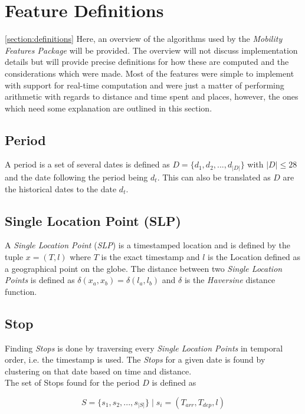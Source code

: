 \section{Feature Definitions}
\ref{section:definitions}
Here, an overview of the algorithms used by the \textit{Mobility Features Package} will be provided. The overview will not discuss implementation details but will provide precise definitions for how these are computed and the considerations which were made. Most of the features were simple to implement with support for real-time computation and were just a matter of performing arithmetic with regards to distance and time spent and places, however, the ones which need some explanation are outlined in this section. 

\subsection{Period}
A period is a set of several dates is defined as $D = \{d_1, d_2, ..., d_{|D|}\}$ with $|D| \leq 28$ and the date following the period being $d_t$. This can also be translated as $D$ are the historical dates to the date $d_t$.\\

\subsection{Single Location Point (SLP)}
A \textit{Single Location Point} (\textit{SLP}) is a timestamped location and is defined by the tuple $x = (T, l)$ where $T$ is the exact timestamp and $l$ is the Location defined as a geographical point on the globe. The distance between two \textit{Single Location Points} is defined as $\delta(x_a, x_b) = \delta(l_a, l_b)$ and $\delta$ is the \textit{Haversine} distance function.

\subsection{Stop}
Finding \textit{Stops} is done by traversing every \textit{Single Location Points} in temporal order, i.e. the timestamp is used. The \textit{Stops} for a given date is found by clustering  on that date based on time and distance. \\

The set of Stops found for the period $D$ is defined as

$$S = \{s_1, s_2, ..., s_{|S|}\} \;| \; s_i = (T_{arr}, T_{dep}, l)$$ 

